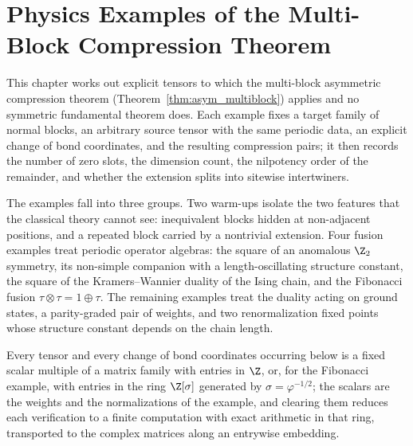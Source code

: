 
\chapter{Physics Examples of the Multi-Block Compression Theorem}%
\label{ch:asymmetric_examples}

This chapter works out explicit tensors to which the multi-block
asymmetric compression theorem (Theorem~\ref{thm:asym_multiblock}) applies
and no symmetric fundamental theorem does. Each example fixes a target
family of normal blocks, an arbitrary source tensor with the same periodic
data, an explicit change of bond coordinates, and the resulting compression
pairs; it then records the number of zero slots, the dimension count, the
nilpotency order of the remainder, and whether the extension splits into
sitewise intertwiners.

The examples fall into three groups. Two warm-ups isolate the two features
that the classical theory cannot see: inequivalent blocks hidden at
non-adjacent positions, and a repeated block carried by a nontrivial
extension. Four fusion examples treat periodic operator algebras: the
square of an anomalous $\Z_2$ symmetry, its non-simple companion with a
length-oscillating structure constant, the square of the Kramers--Wannier
duality of the Ising chain, and the Fibonacci fusion
$\tau\otimes\tau=1\oplus\tau$. The remaining examples treat the duality
acting on ground states, a parity-graded pair of weights, and two
renormalization fixed points whose structure constant depends on the chain
length.

Every tensor and every change of bond coordinates occurring below is a
fixed scalar multiple of a matrix family with entries in $\Z$, or, for the
Fibonacci example, with entries in the ring $\Z[\sigma]$ generated by
$\sigma=\varphi^{-1/2}$; the scalars are the weights and the normalizations
of the example, and clearing them reduces each verification to a finite
computation with exact arithmetic in that ring, transported to the complex
matrices along an entrywise embedding.

